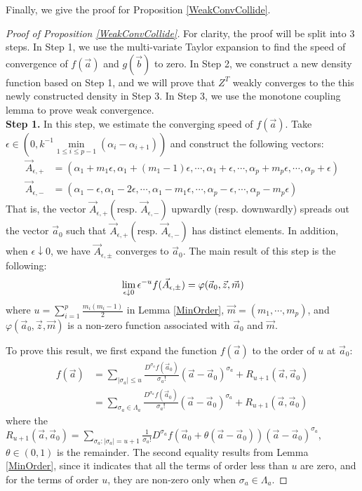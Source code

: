 Finally, we give the proof for Proposition \ref{WeakConvCollide}. 
\begin{proof}[Proof of Proposition \ref{WeakConvCollide}] For clarity, the proof will be split into $3$ steps. In Step 1, we use the multi-variate Taylor expansion to find the speed of convergence of $f(\vec{a})$ and $g(\vec{b})$ to zero. In Step 2, we construct a new density function based on Step 1, and we will prove that $Z^{T}$ weakly converges to the this newly constructed density in Step 3. In Step 3, we use the monotone coupling lemma to prove weak convergence.\\
\textbf{Step 1. }In this step, we estimate the converging speed of $f(\vec{a})$. Take $\epsilon\in (0,k^{-1}\min\limits_{1\leqslant i\leqslant p-1}(\alpha_{i}-\alpha_{i+1}))$ and construct the following vectors:
\begin{align*}
	\vec{A}_{\epsilon,+}&=(\alpha_{1}+m_{1}\epsilon, \alpha_{1}+(m_{1}-1)\epsilon,\cdots,\alpha_{1}+\epsilon,\cdots,\alpha_{p}+m_{p}\epsilon,\cdots,\alpha_{p}+\epsilon)\\
	\vec{A}_{\epsilon,-}&=(\alpha_{1}-\epsilon, \alpha_{1}-2\epsilon,\cdots,\alpha_{1}-m_{1}\epsilon,\cdots,\alpha_{p}-\epsilon,\cdots,\alpha_{p}-m_{p}\epsilon)
\end{align*}
That is, the vector $\vec{A}_{\epsilon,+}(\text{resp. }\vec{A}_{\epsilon,-})$ upwardly (resp. downwardly) spreads out the vector $\vec{a}_{0}$ such that $\vec{A}_{\epsilon,+}(\text{resp. }\vec{A}_{\epsilon,-})$ has distinct elements. In addition, when $\epsilon\downarrow 0$, we have $\vec{A}_{\epsilon,\pm}$ converges to $\vec{a}_{0}$. The main result of this step is the following:
\begin{align}{\label{ConvSpeed}}
	\lim_{\epsilon\downarrow 0}\epsilon^{-u}f(\vec{A}_{\epsilon,\pm})=\varphi(\vec{a}_{0},\vec{z},\vec{m})
\end{align}
where $u=\sum_{i=1}^{p}\frac{m_{i}(m_{i}-1)}{2}$ in Lemma \ref{MinOrder}, $\vec{m}=(m_{1},\cdots,m_{p})$, and $\varphi(\vec{a}_{0},\vec{z},\vec{m})$ is a non-zero function associated with $\vec{a}_{0}$ and $\vec{m}$.

To prove this result, we first expand the function $f(\vec{a})$ to the order of $u$ at $\vec{a}_{0}$:
\begin{align*}
	f(\vec{a})&=\sum_{|\sigma_{a}|\leqslant u}\frac{D^{\sigma_{a}}f(\vec{a}_{0})}{\sigma_{a}!}(\vec{a}-\vec{a}_{0})^{\sigma_{a}}+R_{u+1}(\vec{a},\vec{a}_{0})\\
	&= \sum_{\sigma_{a}\in \Lambda_{a}}\frac{D^{\sigma_{a}}f(\vec{a}_{0})}{\sigma_{a}!}(\vec{a}-\vec{a}_{0})^{\sigma_{a}}+R_{u+1}(\vec{a},\vec{a}_{0})
\end{align*} 
where the $R_{u+1}(\vec{a},\vec{a}_{0})=\sum_{\sigma_{a}:|\sigma_{a}|=u+1}\frac{1}{\sigma_{a}!}D^{\sigma_{a}}f(\vec{a}_{0}+\theta(\vec{a}-\vec{a}_{0}))(\vec{a}-\vec{a}_{0})^{\sigma_{a}}$, $\theta\in(0,1)$ is the remainder. The second equality results from Lemma \ref{MinOrder}, since it indicates that all the terms of order less than $u$ are zero, and for the terms of order $u$, they are non-zero only when $\sigma_{a}\in\Lambda_{a}$.


\end{proof}
